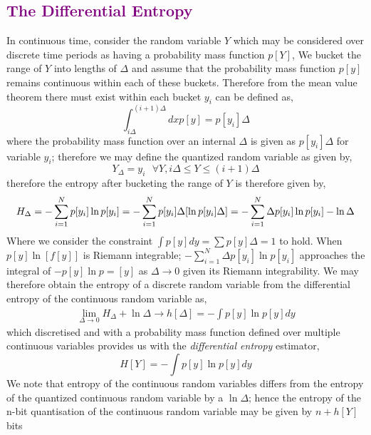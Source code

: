 \documentclass[7pt]{article}
\begin{document}
\subsection*{\textcolor{purple}{The Differential Entropy}}
In continuous time, consider the random variable $Y$ which may be considered over discrete time periods as having a probability mass function  $p[Y]$,
We bucket the range of $Y$ into lengths of $\Delta$ and assume that the probability mass function $p[y]$  remains continuous within each of these buckets. Therefore from the mean value theorem there must exist within each bucket $y_i$ can be defined as,
\begin{equation}
\int_{i\Delta}^{(i+1)\Delta}  dx p[y]  = p[y_i] \Delta
\end{equation}
where the  probability mass function over an internal $\Delta$ is given as $p[y_i]\Delta$ for variable $y_i$; therefore we may define the  quantized random variable as given by,
\begin{equation}
Y_{\Delta} = y_i \text{     }\forall Y,i\Delta \leq Y \leq (i+1) \Delta
\end{equation}
therefore the entropy after bucketing the range of $Y$ is therefore given by,
\begin{equation}
H_{\Delta} = - \sum_{i=1}^{N}  p[y_i] \ln p[y_i] \\
= - \sum_{i=1}^{N}  p [ y_i ] \Delta [ \ln p[ y_i ] \Delta ] \\
= - \sum_{i=1}^{N}  \Delta  p [ y_i ]  \ln p [ y_i ] - \ln \Delta
\end{equation}
Where we consider the constraint $\int p[y]  dy = \sum p[y] \Delta = 1$ to hold. When $p[y]\ln[f[y]]$ is Riemann integrable; $- \sum_{i=1}^{N}  \Delta  p [ y_i ]  \ln p [ y_i ]$ approaches the integral of $-p[y]\ln p=[y]$ as $\Delta \rightarrow 0$ given its Riemann integrability.
We may therefore obtain the entropy of a discrete random variable from the differential entropy of the continuous random variable as,
\begin{equation}
\begin{split}
\lim\limits_{\Delta \rightarrow 0} H_{\Delta} + \ln \Delta  \rightarrow h[\Delta] = - \int p[y] \ln p[y] dy
\end{split}
\end{equation}
which discretised and with a probability mass function defined over multiple continuous variables provides us with the \emph{differential entropy} estimator,
$$
H[Y] = - \int p[y] \ln p[y] dy
$$
We note that entropy of the continuous random variables  differs from the entropy of the quantized  continuous random variable by a $\ln \Delta$; hence the entropy of the n-bit quantisation of the continuous random variable may be given by $n + h[Y]$ bits
\end{document}
